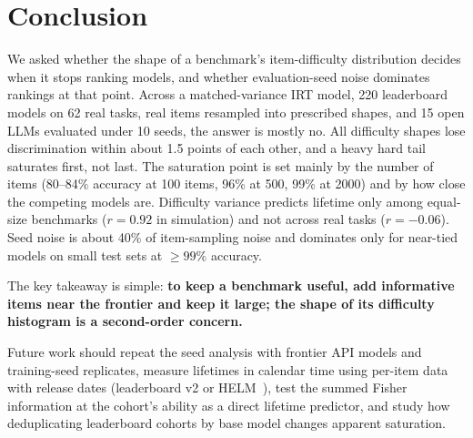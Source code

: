 \section{Conclusion}
\label{sec:conclusion}

We asked whether the shape of a benchmark's item-difficulty distribution decides when it stops ranking models, and whether evaluation-seed noise dominates rankings at that point. Across a matched-variance IRT model, 220 leaderboard models on 62 real tasks, real items resampled into prescribed shapes, and 15 open LLMs evaluated under 10 seeds, the answer is mostly no. All difficulty shapes lose discrimination within about 1.5 points of each other, and a heavy hard tail saturates first, not last. The saturation point is set mainly by the number of items (80--84\% accuracy at 100 items, 96\% at 500, 99\% at 2000) and by how close the competing models are. Difficulty variance predicts lifetime only among equal-size benchmarks ($r = 0.92$ in simulation) and not across real tasks ($r = -0.06$). Seed noise is about 40\% of item-sampling noise and dominates only for near-tied models on small test sets at $\ge 99\%$ accuracy.

The key takeaway is simple: {\bf to keep a benchmark useful, add informative items near the frontier and keep it large; the shape of its difficulty histogram is a second-order concern.}

Future work should repeat the seed analysis with frontier API models and training-seed replicates, measure lifetimes in calendar time using per-item data with release dates (\eg leaderboard v2 or HELM~\citep{liang2023holistic}), test the summed Fisher information at the cohort's ability as a direct lifetime predictor, and study how deduplicating leaderboard cohorts by base model changes apparent saturation.
